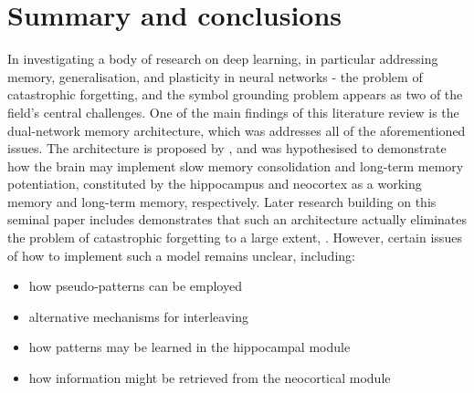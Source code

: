 \section{Summary and conclusions}

In investigating a body of research on deep learning, in particular addressing memory, generalisation, and plasticity in neural networks - the problem of catastrophic forgetting, and the symbol grounding problem appears as two of the field's central challenges. One of the main findings of this literature review is the dual-network memory architecture, which was addresses all of the aforementioned issues. The architecture is proposed by \cite{McClelland1995}, and was hypothesised to demonstrate how the brain may implement slow memory consolidation and long-term memory potentiation, constituted by the hippocampus and neocortex as a working memory and long-term memory, respectively. Later research building on this seminal paper includes demonstrates that such an architecture actually eliminates the problem of catastrophic forgetting to a large extent, \cite{French1997, Ans1997, Ans2000, French2001, Hattori2010, Hattori2014}. However, certain issues of how to implement such a model remains unclear, including:
\begin{itemize}
\item how pseudo-patterns can be employed
\item alternative mechanisms for interleaving
\item how patterns may be learned in the hippocampal module
\item how information might be retrieved from the neocortical module
\end{itemize}
